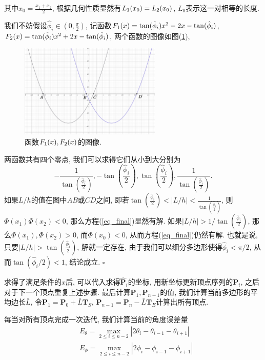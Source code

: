 \documentclass[utf8]{ctexart} %
\numberwithin{figure}{section}
\numberwithin{equation}{section}
\begin{document}
其中$x_0 = \frac{x_1+x_2}2$, 根据几何性质显然有$\boldmath{L}_1(x_0) = \boldmath{L}_2(x_0)$, $L_0$表示这一对相等的长度. \par 
我们不妨假设$\hat{\phi}_i\in(0,\frac{\pi}2)$, 记函数$\boldmath{F}_1(x) = \tan(\hat{\phi}_i)x^2-2x-\tan(\hat{\phi}_i)$, $\boldmath{F}_2(x) = \tan(\hat{\phi}_i)x^2+2x-\tan(\hat{\phi}_i)$, 两个函数的图像如图(\ref{f1f2}), 
\begin{figure}[h]
	\centering
	\includegraphics[width = 0.6\textwidth]{figures/f1f2.png}
	\caption{函数$\boldmath{F}_1(x), \boldmath{F}_2(x)$的图像. }
	\label{f1f2}
\end{figure}
 两函数共有四个零点, 我们可以求得它们从小到大分别为$$-\frac{1}{\tan(\frac{\hat{\phi}_i}2)}, -\tan(\frac{\hat{\phi}_i}2),\tan(\frac{\hat{\phi}_i}2),\frac 1{\tan(\frac{\hat{\phi}_i}2)}. $$
 如果$L/h$的值在图中$AB$或$CD$之间, 即若$\tan(\frac{\hat{\phi}_i}2)<|L/h|<\frac 1{\tan(\frac{\hat{\phi}_i}2)}$, 则$\Phi(x_1)\Phi(x_2)<0$, 那么方程(\ref{eq_final})显然有解. 如果$|L/h|> 1/\tan(\frac{\hat{\phi}_i}2)$, 那么$\Phi(x_1), \Phi(x_2)>0$, 而$\Phi(x_0)<0$, 从而方程(\ref{eq_final})仍然有解. 也就是说, 只要$|L/h|>\tan(\frac{\hat{\phi}_i}2)$, 解就一定存在, 由于我们可以细分多边形使得$\hat{\phi}_i<\pi/2$, 从而$\tan({\hat{\phi}_i}/2)<1$, 结论成立.
 $\square$\par 
	 求得了满足条件的$x$后, 可以代入求得$\hat{\boldsymbol{P}}_i$的坐标, 用新坐标更新顶点序列的$\boldsymbol{P}_i$, 之后对于下一个顶点重复上述步骤. 最后计算$\boldsymbol{P}_1, \boldsymbol{P}_{n-1}$的值, 我们计算当前多边形的平均边长$\bar{L}$, 令$\boldsymbol{P}_1 = \boldsymbol{P}_0+\bar{L}\boldsymbol{T}_S$, $\boldsymbol{P}_{n-1} = \boldsymbol{P}_n-\bar{L}\boldsymbol{T}_E$计算出所有顶点. \par 
	 每当对所有顶点完成一次迭代, 我们计算当前的角度误差量
	 \begin{equation}\label{error}
	 \begin{aligned}
	 &E_{\theta} = \max_{2\leq i\leq n-2}|2\theta_i-\theta_{i-1}-\theta_{i+1}|\\
	 &E_{\phi} = \max_{2\leq i\leq n-2}|2\phi_i-\phi_{i-1}-\phi_{i+1}|
	 \end{aligned}
	 \end{equation}
\end{document}
